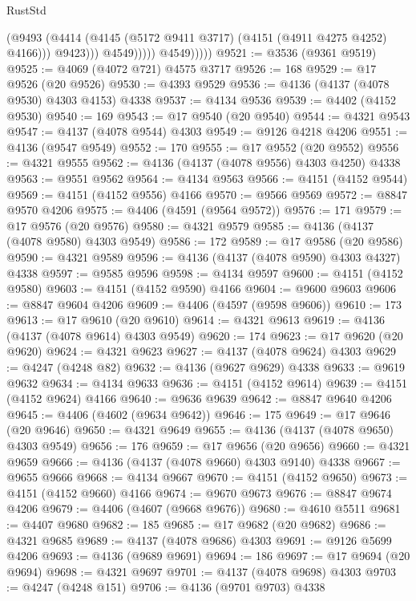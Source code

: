 \begin{lexlean}{RustStd}
\begin{coremodule}
                            (@9493
                              (@4414 (@4145 (@5172 @9411 @3717) (@4151 (@4911 @4275 @4252) @4166)))
                              @9423)))
                        @4549)))))
              @4549)))))
@9521 := @3536 (@9361 @9519)
@9525 := @4069 (@4072 @721) @4575 @3717
@9526 := 168
@9529 := @17 @9526 (@20 @9526)
@9530 := @4393 @9529
@9536 := @4136 (@4137 (@4078 @9530) @4303 @4153) @4338
@9537 := @4134 @9536
@9539 := @4402 (@4152 @9530)
@9540 := 169
@9543 := @17 @9540 (@20 @9540)
@9544 := @4321 @9543
@9547 := @4137 (@4078 @9544) @4303
@9549 := @9126 @4218 @4206
@9551 := @4136 (@9547 @9549)
@9552 := 170
@9555 := @17 @9552 (@20 @9552)
@9556 := @4321 @9555
@9562 := @4136 (@4137 (@4078 @9556) @4303 @4250) @4338
@9563 := @9551 @9562
@9564 := @4134 @9563
@9566 := @4151 (@4152 @9544)
@9569 := @4151 (@4152 @9556) @4166
@9570 := @9566 @9569
@9572 := @8847 @9570 @4206
@9575 := @4406 (@4591 (@9564 @9572))
@9576 := 171
@9579 := @17 @9576 (@20 @9576)
@9580 := @4321 @9579
@9585 := @4136 (@4137 (@4078 @9580) @4303 @9549)
@9586 := 172
@9589 := @17 @9586 (@20 @9586)
@9590 := @4321 @9589
@9596 := @4136 (@4137 (@4078 @9590) @4303 @4327) @4338
@9597 := @9585 @9596
@9598 := @4134 @9597
@9600 := @4151 (@4152 @9580)
@9603 := @4151 (@4152 @9590) @4166
@9604 := @9600 @9603
@9606 := @8847 @9604 @4206
@9609 := @4406 (@4597 (@9598 @9606))
@9610 := 173
@9613 := @17 @9610 (@20 @9610)
@9614 := @4321 @9613
@9619 := @4136 (@4137 (@4078 @9614) @4303 @9549)
@9620 := 174
@9623 := @17 @9620 (@20 @9620)
@9624 := @4321 @9623
@9627 := @4137 (@4078 @9624) @4303
@9629 := @4247 (@4248 @82)
@9632 := @4136 (@9627 @9629) @4338
@9633 := @9619 @9632
@9634 := @4134 @9633
@9636 := @4151 (@4152 @9614)
@9639 := @4151 (@4152 @9624) @4166
@9640 := @9636 @9639
@9642 := @8847 @9640 @4206
@9645 := @4406 (@4602 (@9634 @9642))
@9646 := 175
@9649 := @17 @9646 (@20 @9646)
@9650 := @4321 @9649
@9655 := @4136 (@4137 (@4078 @9650) @4303 @9549)
@9656 := 176
@9659 := @17 @9656 (@20 @9656)
@9660 := @4321 @9659
@9666 := @4136 (@4137 (@4078 @9660) @4303 @9140) @4338
@9667 := @9655 @9666
@9668 := @4134 @9667
@9670 := @4151 (@4152 @9650)
@9673 := @4151 (@4152 @9660) @4166
@9674 := @9670 @9673
@9676 := @8847 @9674 @4206
@9679 := @4406 (@4607 (@9668 @9676))
@9680 := @4610 @5511
@9681 := @4407 @9680
@9682 := 185
@9685 := @17 @9682 (@20 @9682)
@9686 := @4321 @9685
@9689 := @4137 (@4078 @9686) @4303
@9691 := @9126 @5699 @4206
@9693 := @4136 (@9689 @9691)
@9694 := 186
@9697 := @17 @9694 (@20 @9694)
@9698 := @4321 @9697
@9701 := @4137 (@4078 @9698) @4303
@9703 := @4247 (@4248 @151)
@9706 := @4136 (@9701 @9703) @4338

\end{coremodule}
\end{lexlean}
